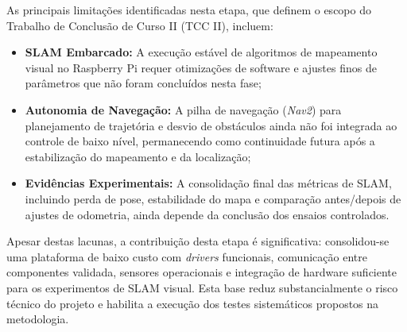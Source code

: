 As principais limitações identificadas nesta etapa, que definem o escopo do Trabalho de Conclusão de Curso II (TCC II), incluem:
\begin{itemize}
    \item \textbf{SLAM Embarcado:} A execução estável de algoritmos de mapeamento visual no Raspberry Pi requer otimizações de software e ajustes finos de parâmetros que não foram concluídos nesta fase;
    \item \textbf{Autonomia de Navegação:} A pilha de navegação (\textit{Nav2}) para planejamento de trajetória e desvio de obstáculos ainda não foi integrada ao controle de baixo nível, permanecendo como continuidade futura após a estabilização do mapeamento e da localização;
    \item \textbf{Evidências Experimentais:} A consolidação final das métricas de SLAM, incluindo perda de pose, estabilidade do mapa e comparação antes/depois de ajustes de odometria, ainda depende da conclusão dos ensaios controlados.
\end{itemize}

Apesar destas lacunas, a contribuição desta etapa é significativa: consolidou-se uma plataforma de baixo custo com \textit{drivers} funcionais, comunicação entre componentes validada, sensores operacionais e integração de hardware suficiente para os experimentos de SLAM visual. Esta base reduz substancialmente o risco técnico do projeto e habilita a execução dos testes sistemáticos propostos na metodologia.
